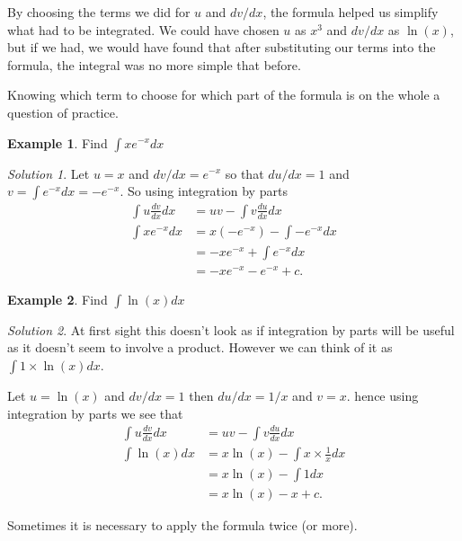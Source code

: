\documentclass[
  11pt,
  oneside]{book}
\newcommand{\slide}{}
\theoremstyle{definition}
\theoremstyle{definition}
\newtheorem{example}{Example}[chapter]
\theoremstyle{definition}
\theoremstyle{definition}
\theoremstyle{remark}
\newtheorem*{solution}{Solution}
\begin{document}
\slide

By choosing the terms we did for \(u\) and \(dv/dx\), the formula helped us simplify what had to be integrated. We could have chosen \(u\) as \(x^3\) and \(dv/dx\) as \(\ln(x)\), but if we had, we would have found that after substituting our terms into the formula, the integral was no more simple that before.

Knowing which term to choose for which part of the formula is on the whole a question of practice.

\slide

\begin{example}
Find \(\displaystyle\int xe^{-x}dx\)
\end{example}

\begin{solution}
Let \(u = x\) and \(dv/dx=e^{-x}\) so that \(du/dx = 1\) and \(v=\displaystyle\int e^{-x}dx = -e^{-x}\). So using integration by parts
\begin{align*}
\int u\frac{dv}{dx}dx& = uv-\int v\frac{du}{dx}dx\\
\int xe^{-x}dx&=x(-e^{-x})-\int-e^{-x}dx\\
&=-xe^{-x}+\int e^{-x}dx\\
&=-xe^{-x}-e^{-x}+c.
\end{align*}
\end{solution}

\slide

\begin{example}
Find \(\displaystyle\int \ln(x)dx\)
\end{example}

\begin{solution}
At first sight this doesn't look as if integration by parts will be useful as it doesn't seem to involve a product. However we can think of it as \(\displaystyle\int 1\times\ln(x)dx\).

Let \(u = \ln(x)\) and \(dv/dx = 1\) then \(du/dx = 1/x\) and \(v = x\). hence using integration by parts we see that
\begin{align*}
\int u\frac{dv}{dx}dx& = uv-\int v\frac{du}{dx}dx\\
\int\ln(x)dx&=x\ln(x)-\int x\times\frac 1x dx\\
&=x\ln(x)-\int 1dx\\
&=x\ln(x)-x + c.
\end{align*}
\end{solution}

\slide

Sometimes it is necessary to apply the formula twice (or more).
\end{document}
